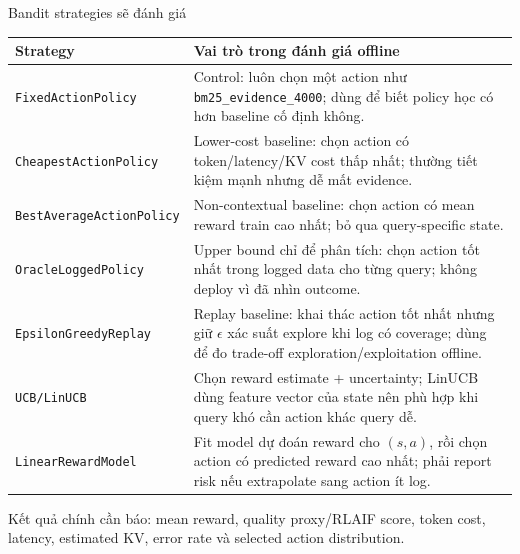 \documentclass[aspectratio=169,10pt]{beamer}
\newcommand{\code}[1]{\texttt{\footnotesize #1}}
\newcommand{\smallcode}[1]{\texttt{\scriptsize #1}}
\begin{document}
\begin{frame}{Bandit strategies sẽ đánh giá}
  \scriptsize
  \renewcommand{\arraystretch}{1.16}
  \begin{tabular}{>{\raggedright\arraybackslash}p{}>{\raggedright\arraybackslash}p{}}
    \toprule
    Strategy & Vai trò trong đánh giá offline \\
    \midrule
    \code{FixedActionPolicy} & Control: luôn chọn một action như \smallcode{bm25\_evidence\_4000}; dùng để biết policy học có hơn baseline cố định không. \\
    \code{CheapestActionPolicy} & Lower-cost baseline: chọn action có token/latency/KV cost thấp nhất; thường tiết kiệm mạnh nhưng dễ mất evidence. \\
    \code{BestAverageActionPolicy} & Non-contextual baseline: chọn action có mean reward train cao nhất; bỏ qua query-specific state. \\
    \code{OracleLoggedPolicy} & Upper bound chỉ để phân tích: chọn action tốt nhất trong logged data cho từng query; không deploy vì đã nhìn outcome. \\
    \code{EpsilonGreedyReplay} & Replay baseline: khai thác action tốt nhất nhưng giữ \(\epsilon\) xác suất explore khi log có coverage; dùng để đo trade-off exploration/exploitation offline. \\
    \code{UCB/LinUCB} & Chọn reward estimate + uncertainty; LinUCB dùng feature vector của state nên phù hợp khi query khó cần action khác query dễ. \\
    \code{LinearRewardModel} & Fit model dự đoán reward cho \((s,a)\), rồi chọn action có predicted reward cao nhất; phải report risk nếu extrapolate sang action ít log. \\
    \bottomrule
  \end{tabular}

  \vspace{0.22cm}
  \footnotesize\color{Muted}
  Kết quả chính cần báo: mean reward, quality proxy/RLAIF score, token cost, latency, estimated KV, error rate và selected action distribution.
\end{frame}
\end{document}
